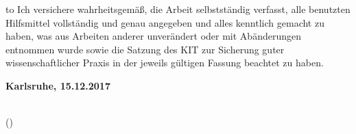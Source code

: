 
\thispagestyle{empty}
\null\vfill
\noindent\hbox to \textwidth{\hrulefill} 
%
{Ich versichere wahrheitsgemäß, die Arbeit selbstständig verfasst, alle benutzten Hilfsmittel vollständig und genau angegeben und alles kenntlich gemacht zu haben, was aus Arbeiten anderer unverändert oder mit Abänderungen entnommen wurde sowie die Satzung des KIT zur Sicherung guter wissenschaftlicher Praxis in der jeweils gültigen Fassung beachtet zu haben.}
 
 
\textbf{Karlsruhe, 15.12.2017}
\vspace{1.5cm}
 
\dotfill\hspace*{8.0cm}\\
\hspace*{2cm}(\theauthor) 
\cleardoublepage